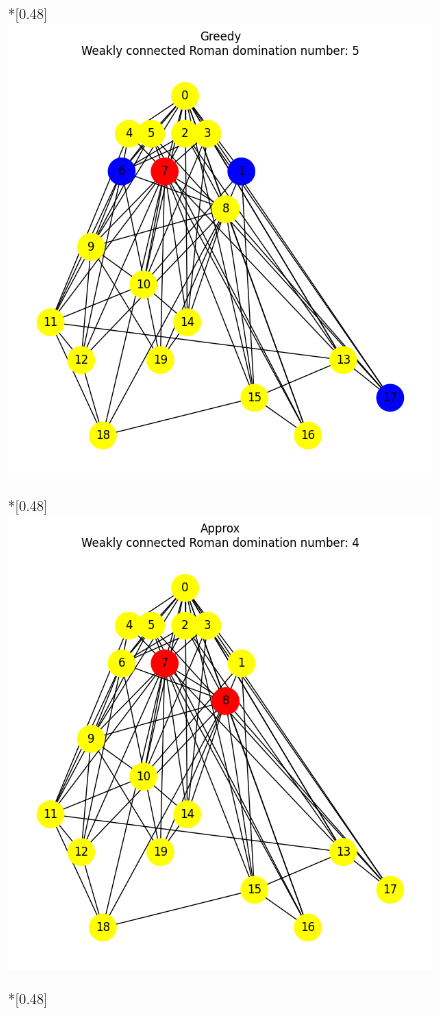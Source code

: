 \begin{figure}[H]
        \begin{subcaptionbox}*{}[0.48\linewidth]
            {\includegraphics[width=0.75\linewidth]{assets/plots/Greedy/ScaleFree_n20_i2_results.png}}
        \end{subcaptionbox}
        \hfill
        \begin{subcaptionbox}*{}[0.48\linewidth]
            {\includegraphics[width=0.75\linewidth]{assets/plots/Approx/ScaleFree_n20_i2_results.png}}
        \end{subcaptionbox}
        \hfill
        \begin{subcaptionbox}*{}[0.48\linewidth]

\end{subcaptionbox}
\end{figure}

